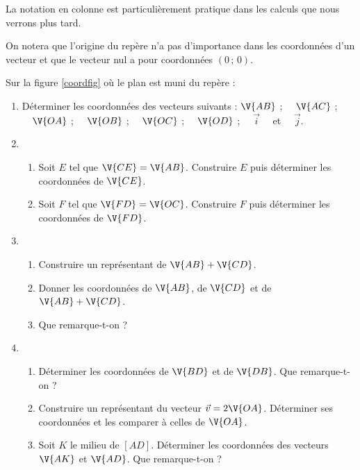 La notation en colonne est particulièrement pratique dans les calculs que nous verrons plus tard.

\begin{rmq} On notera que l'origine du repère n'a pas d'importance dans les coordonnées d'un vecteur et que le vecteur nul a pour coordonn\'ees $(0\,;\,0)$.
\end{rmq}

\begin{act} \label{coord}
 Sur la figure \ref{coordfig}  o\`u le plan est muni du rep\`ere \Oij :
\begin{enumerate}
	\item Déterminer les coordonnées des vecteurs suivants :
			$\V{AB}$ ; $\quad\V{AC}$ ; $\quad\V{OA}$ ; $\quad\V{OB}$ ; $\quad\V{OC}$ ; $\quad\V{OD}$ ; $\quad\vec{i}\quad$ et $\quad\vec{j}$.
	\item \begin{enumerate} \item Soit $E$ tel que $\V{CE}=\V{AB}$.  Construire $E$ puis déterminer les coordonnées de $\V{CE}$.
	\item Soit $F$ tel que $\V{FD}=\V{OC}$. Construire $F$ puis déterminer les coordonnées de $\V{FD}$.\end{enumerate}
	                                                                                                   
	\item
			\begin{enumerate}
				\item Construire un représentant de $\V{AB}+\V{CD}$.
				\item Donner les coordonnées de $\V{AB}$, de $\V{CD}$ et de $\V{AB}+\V{CD}$.
				\item Que remarque-t-on ?
			\end{enumerate}
	\item \begin{enumerate} \item D\'eterminer les coordonn\'ees de $\V{BD}$ et de $\V{DB}$. 
	      Que remarque-t-on ?
	\item Construire un repr\'esentant du vecteur $\vec{v}=2\V{OA}$. D\'eterminer ses coordonn\'ees et les comparer \`a celles de $\V{OA}$.
	\item Soit $K$ le milieu de $[AD]$. D\'eterminer les coordonn\'ees des vecteurs $\V{AK}$ et $\V{AD}$. Que remarque-t-on ?
	\end{enumerate}
	



\end{enumerate}
\end{act}
